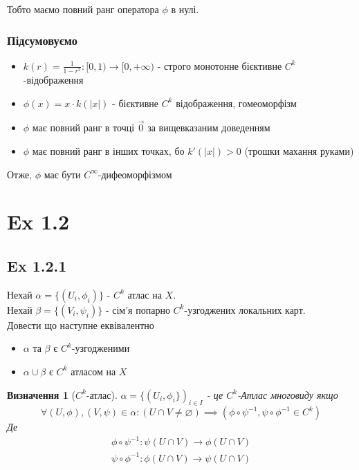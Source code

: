\documentclass[10pt, a4paper]{article} %
\newtheorem*{definition}{Визначення}
\begin{document}
Тобто маємо повний ранг оператора $\phi$ в нулі.

\subsubsection*{Підсумовуємо}

\begin{itemize}
    \item $k(r) = \frac{1}{1-r^2} : [0,1) \to [0,+\infty)$ - строго монотонне бієктивне $C^k$-відображення
    \item $\phi(x) = x \cdot k(|x|)$ - бієктивне $C^k$ відображення, гомеоморфізм
    \item $\phi$ має повний ранг в точці $\vec 0$ за вищевказаним доведенням
    \item $\phi$ має повний ранг в інших точках, бо $k'(|x|) > 0$ (трошки махання руками)
\end{itemize}

Отже, $\phi$ має бути $C^\infty$-дифеоморфізмом 



\section*{Ex 1.2}
\subsection*{Ex 1.2.1}
\begin{mdframed}
    Нехай $\alpha = \{(U_i,\phi_i)\}$ - $C^k$ атлас на $X$.\\
    Нехай $\beta = \{(V_i,\psi_i)\}$ - сім'я попарно $C^k$-узгоджених локальних карт.\\
    Довести що наступне еквівалентно 
    \begin{itemize}
        \item $\alpha$ та $\beta$ є $C^k$-узгодженими
        \item $\alpha\cup\beta$ є $C^k$ атласом на $X$
    \end{itemize}
\end{mdframed}

\begin{definition}[$C^k$-атлас]
    $\alpha = \{(U_{i}, \phi_{i}\})_{i\in I}$ - це  $C^k$-Атлас многовиду якщо
    \[\forall (U,\phi), (V,\psi) \in \alpha: (U\cap V \ne \varnothing) \implies \left(\phi\circ\psi^{-1}, \psi\circ\phi^{-1} \in C^k\right)\]
    Де 
    \begin{gather*}
        \phi\circ\psi^{-1} : \psi(U\cap V) \to \phi(U\cap V)\\
        \psi\circ\phi^{-1} : \phi(U\cap V) \to \psi(U\cap V)\\
    \end{gather*}
\end{definition}
\end{document}
